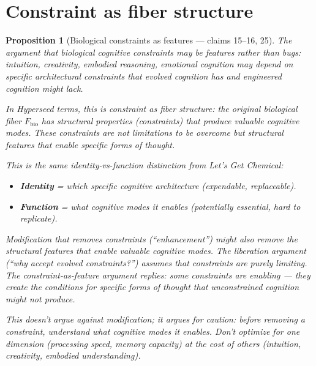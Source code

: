 \documentclass[11pt,a4paper]{article}
\newtheorem{proposition}[definition]{Proposition}
\begin{document}
\section{Constraint as fiber structure}
\label{sec:constraint}

\begin{proposition}[Biological constraints as features --- claims 15--16, 25]
\label{prop:constraint}
The argument that biological cognitive constraints may be features rather
than bugs: intuition, creativity, embodied reasoning, emotional cognition
may depend on specific architectural constraints that evolved cognition
has and engineered cognition might lack.

In Hyperseed terms, this is \emph{constraint as fiber structure}: the
original biological fiber $F_{\text{bio}}$ has structural properties
(constraints) that produce valuable cognitive modes. These constraints
are not limitations to be overcome but structural features that enable
specific forms of thought.

This is the same identity-vs-function distinction from Let's Get
Chemical:
\begin{itemize}
\item \textbf{Identity} = which specific cognitive architecture
  (expendable, replaceable).
\item \textbf{Function} = what cognitive modes it enables (potentially
  essential, hard to replicate).
\end{itemize}

Modification that removes constraints (``enhancement'') might also
remove the structural features that enable valuable cognitive modes.
The liberation argument (``why accept evolved constraints?'') assumes
that constraints are purely limiting. The constraint-as-feature argument
replies: some constraints are enabling --- they create the conditions
for specific forms of thought that unconstrained cognition might not
produce.

This doesn't argue against modification; it argues for caution: before
removing a constraint, understand what cognitive modes it enables. Don't
optimize for one dimension (processing speed, memory capacity) at the
cost of others (intuition, creativity, embodied understanding).
\end{proposition}

\end{document}
